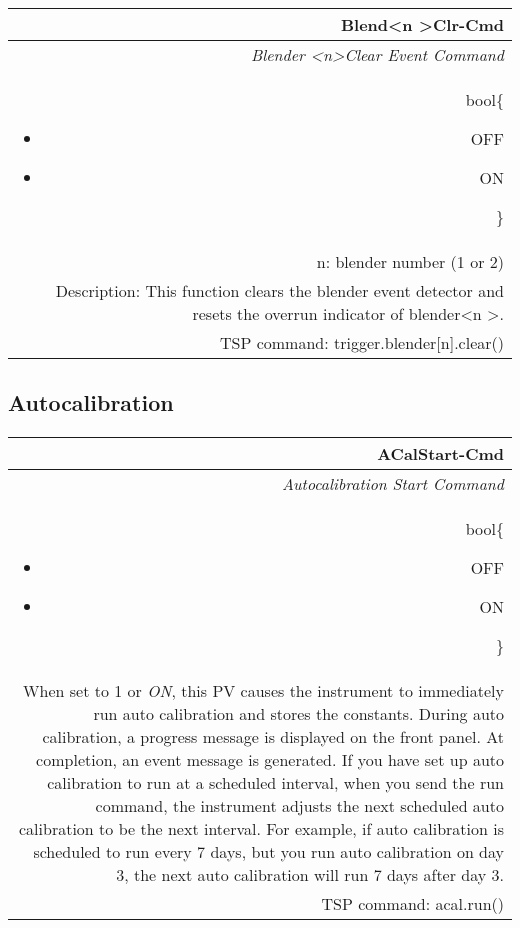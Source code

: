 \documentclass[openany]{article}
\begin{document}
		\begin{tabular}{N}
			\hline
			\bfseries Blend{\textless n \textgreater}Clr-Cmd\label{pv:blendclr-cmd} \\ \hline
			\emph{Blender \textless n\textgreater Clear Event Command} \\
			bool\{\begin{itemize}[noitemsep]
				\small
				\item[] OFF
				\item[] ON
			\end{itemize}\} \\
			n: blender number (1 or 2) \\
			Description: This function clears the blender event detector and resets the overrun indicator of blender\textless n \textgreater. \\
			TSP command: trigger.blender[n].clear()
		\end{tabular}

	\subsection{Autocalibration}\label{pvgroup:autocalibration}

		\paragraph{} %
		
		\begin{tabular}{N}
			\hline
			\bfseries ACalStart-Cmd\label{pv:acalstart-cmd} \\ \hline
			\emph{Autocalibration Start Command} \\
			bool\{\begin{itemize}[noitemsep]
				\small
				\item[] OFF
				\item[] ON
			\end{itemize}\} \\
			When set to 1 or \emph{ON}, this PV causes the instrument to immediately run auto calibration and stores the constants. During auto calibration, a progress message is displayed on the front panel. At completion, an event message is generated.
If you have set up auto calibration to run at a scheduled interval, when you send the run command, the instrument adjusts the next scheduled auto calibration to be the next interval. For example, if auto calibration is scheduled to run every 7 days, but you run auto calibration on day 3, the next auto calibration will run 7 days after day 3. \\
			TSP command: acal.run()
		\end{tabular}
\end{document}
